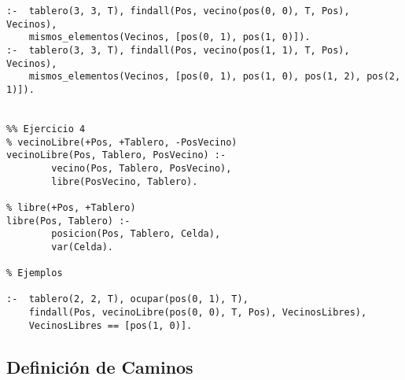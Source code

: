 \begin{verbatim}
:-  tablero(3, 3, T), findall(Pos, vecino(pos(0, 0), T, Pos), Vecinos),
    mismos_elementos(Vecinos, [pos(0, 1), pos(1, 0)]).
:-  tablero(3, 3, T), findall(Pos, vecino(pos(1, 1), T, Pos), Vecinos),
    mismos_elementos(Vecinos, [pos(0, 1), pos(1, 0), pos(1, 2), pos(2, 1)]).


%% Ejercicio 4
% vecinoLibre(+Pos, +Tablero, -PosVecino)
vecinoLibre(Pos, Tablero, PosVecino) :-
        vecino(Pos, Tablero, PosVecino),
        libre(PosVecino, Tablero).

% libre(+Pos, +Tablero) 
libre(Pos, Tablero) :-
        posicion(Pos, Tablero, Celda),
        var(Celda).

% Ejemplos

:-  tablero(2, 2, T), ocupar(pos(0, 1), T),
    findall(Pos, vecinoLibre(pos(0, 0), T, Pos), VecinosLibres),
    VecinosLibres == [pos(1, 0)].

\end{verbatim}

\newpage

\subsection{Definición de Caminos}

